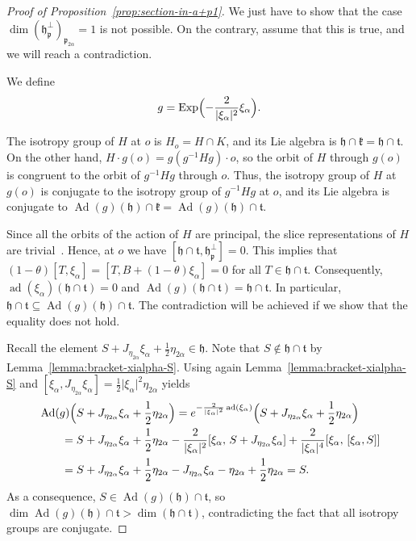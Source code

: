 \documentclass[12pt, a4paper]{amsart}
\newcommand{\g}{\mathfrak}
\newcommand{\ad}{\operatorname{ad}}
\newcommand{\Ad}{\operatorname{Ad}}
\newcommand{\Exp}{\operatorname{Exp}}
\theoremstyle{definition}
\begin{document}
\begin{proof}[Proof of Proposition~\ref{prop:section-in-a+p1}]
We just have to show that the case $\dim(\g{h}_{\g{p}}^\perp)_{\g{p}_{2\alpha}}= 1$ is not possible.
On the contrary, assume that this is true, and we will reach a contradiction.

We define 
\[
g=\Exp\Bigl(-\frac{2}{\lvert\xi_\alpha\rvert^2}\xi_\alpha\Bigr).
\]

The isotropy group of $H$ at $o$ is $H_o=H\cap K$, 
and its Lie algebra is $\g{h}\cap\g{k}=\g{h}\cap\g{t}$.
On the other hand, $H\cdot g(o)=g(g^{-1}Hg)\cdot o$, 
so the orbit of $H$ through $g(o)$ is congruent to the orbit of $g^{-1}Hg$ through $o$.
Thus, the isotropy group of $H$ at $g(o)$ is conjugate to the isotropy group of $g^{-1}Hg$ at $o$, 
and its Lie algebra is conjugate to $\Ad(g)(\g{h})\cap\g{k}=\Ad(g)(\g{h})\cap\g{t}$.

Since all the orbits of the action of $H$ are principal, the slice representations
of $H$ are trivial~\cite[Theorem~2.1.3]{BerndtConsoleOlmos16}.
Hence, at $o$ we have $[\g{h}\cap\g{t},\g{h}_{\g{p}}^\perp]=0$.
This implies that
$(1-\theta)[T,\xi_\alpha]=[T,B+(1-\theta)\xi_\alpha]=0$
for all $T\in\g{h}\cap\g{t}$.
Consequently, $\ad(\xi_\alpha)(\g{h}\cap \g{t})=0$ and $\Ad(g)(\g{h}\cap\g{t})=\g{h}\cap\g{t}$.
In particular, $\g{h}\cap\g{t}\subseteq\Ad(g)(\g{h})\cap\g{t}$.
The contradiction will be achieved if we show that the equality does not hold.

Recall the element $S+J_{\eta_{2\alpha}}\xi_\alpha
+\frac{1}{2}\eta_{2\alpha}\in\g{h}$.
Note that $S\not \in \g{h}\cap \g{t}$ by Lemma~\ref{lemma:bracket-xialpha-S}.
Using again Lemma~\ref{lemma:bracket-xialpha-S} and 
$[\xi_\alpha,J_{\eta_{2\alpha}}\xi_\alpha]=\frac{1}{2}\lvert\xi_\alpha\rvert^2\eta_{2\alpha}$ yields
\begin{align*}
&\Ad(g)\Bigl(S+J_{\eta_{2\alpha}}\xi_\alpha+\frac{1}{2}\eta_{2\alpha}\Bigr)
=e^{-\frac{2}{\lvert\xi_\alpha\rvert^2}\ad(\xi_\alpha)}
\Bigl(S+J_{\eta_{2\alpha}}\xi_\alpha+\frac{1}{2}\eta_{2\alpha}\Bigr)\\
&\qquad{}=S+J_{\eta_{2\alpha}}\xi_\alpha+\frac{1}{2}\eta_{2\alpha}
-\frac{2}{\lvert\xi_\alpha\rvert^2}[\xi_\alpha,\,
S+J_{\eta_{2\alpha}}\xi_\alpha]
+\frac{2}{\lvert\xi_\alpha\rvert^4}[\xi_\alpha,\,[\xi_\alpha,S]]\\
&\qquad{}=S+J_{\eta_{2\alpha}}\xi_\alpha+\frac{1}{2}\eta_{2\alpha}
-J_{\eta_{2\alpha}}\xi_\alpha
-\eta_{2\alpha}
+\frac{1}{2}\eta_{2\alpha}=S.
\end{align*}
As a consequence, $S\in\Ad(g)(\g{h})\cap\g{t}$, 
so $\dim\Ad(g)(\g{h})\cap\g{t}>\dim(\g{h}\cap\g{t})$, contradicting the fact that all isotropy groups are conjugate.
\end{proof}
\end{document}
